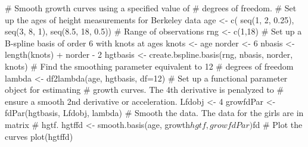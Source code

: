 \documentclass{article}
\begin{document}
\begin{Examples}
\begin{ExampleCode}

#  Smooth growth curves using a specified value of
#  degrees of freedom.
#  Set up the ages of height measurements for Berkeley data
age <- c( seq(1, 2, 0.25), seq(3, 8, 1), seq(8.5, 18, 0.5))
#  Range of observations
rng <- c(1,18)
#  Set up a B-spline basis of order 6 with knots at ages
knots  <- age
norder <- 6
nbasis <- length(knots) + norder - 2
hgtbasis <- create.bspline.basis(rng, nbasis, norder, knots)
#  Find the smoothing parameter equivalent to 12
#  degrees of freedom
lambda <- df2lambda(age, hgtbasis, df=12)
#  Set up a functional parameter object for estimating
#  growth curves.  The 4th derivative is penalyzed to
#  ensure a smooth 2nd derivative or acceleration.
Lfdobj <- 4
growfdPar <- fdPar(hgtbasis, Lfdobj, lambda)
#  Smooth the data.  The data for the girls are in matrix
#  hgtf.
hgtffd <- smooth.basis(age, growth$hgtf, growfdPar)$fd
#  Plot the curves
plot(hgtffd)

\end{ExampleCode}
\end{Examples}
\end{document}
